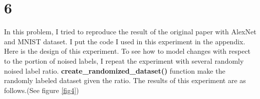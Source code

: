 \documentclass[10pt]{article}
\begin{document}
\section*{6}
In this problem, I tried to reproduce the result of the original paper with AlexNet and MNIST dataset.
I put the code I used in this experiment in the appendix. Here is the design of this experiment. 
To see how to model changes with respect to the portion of noised labels, I repeat the experiment with several randomly noised label ratio. 
\textbf{create\_randomized\_dataset()} function make the randomly labeled dataset given the ratio. The results of this experiment are as follows.(See figure \ref{fig4})
\begin{figure}[!h]
    \begin{center}
\end{center}
\end{figure}
\end{document}
